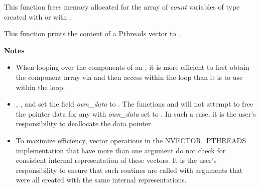 \documentclass[letterpaper,10pt,english]{sphinxmanual}
\begin{document}

\begin{fulllineitems}
\label{nvectors/NVector_Pthreads:c.N_VDestroyVectorArray_Pthreads}
This function frees memory allocated for the array of \emph{count}
variables of type  created with
{\hyperref[nvectors/NVector_Pthreads:c.N_VCloneVectorArray_Pthreads]{\emph{}}} or with
{\hyperref[nvectors/NVector_Pthreads:c.N_VCloneEmptyVectorArray_Pthreads]{\emph{}}}.

\end{fulllineitems}


\begin{fulllineitems}
\label{nvectors/NVector_Pthreads:c.N_VPrint_Pthreads}
This function prints the content of a Pthreads vector to .

\end{fulllineitems}


\textbf{Notes}
\begin{itemize}
\item {} 
When looping over the components of an , it is more
efficient to first obtain the component array via  and then access  within the loop than it
is to use  within the loop.

\item {} 
{\hyperref[nvectors/NVector_Pthreads:c.N_VNewEmpty_Pthreads]{\emph{}}}, {\hyperref[nvectors/NVector_Pthreads:c.N_VMake_Pthreads]{\emph{}}}, and
{\hyperref[nvectors/NVector_Pthreads:c.N_VCloneEmptyVectorArray_Pthreads]{\emph{}}} set the field \emph{own\_data}
to .  The functions  and
{\hyperref[nvectors/NVector_Pthreads:c.N_VDestroyVectorArray_Pthreads]{\emph{}}} will not attempt to free the
pointer data for any  with \emph{own\_data} set to .
In such a case, it is the user's responsibility to deallocate the
data pointer.

\item {} 
To maximize efficiency, vector operations in the NVECTOR\_PTHREADS
implementation that have more than one  argument do not
check for consistent internal representation of these vectors. It is
the user's responsibility to ensure that such routines are called
with  arguments that were all created with the same
internal representations.

\end{itemize}
\end{document}
